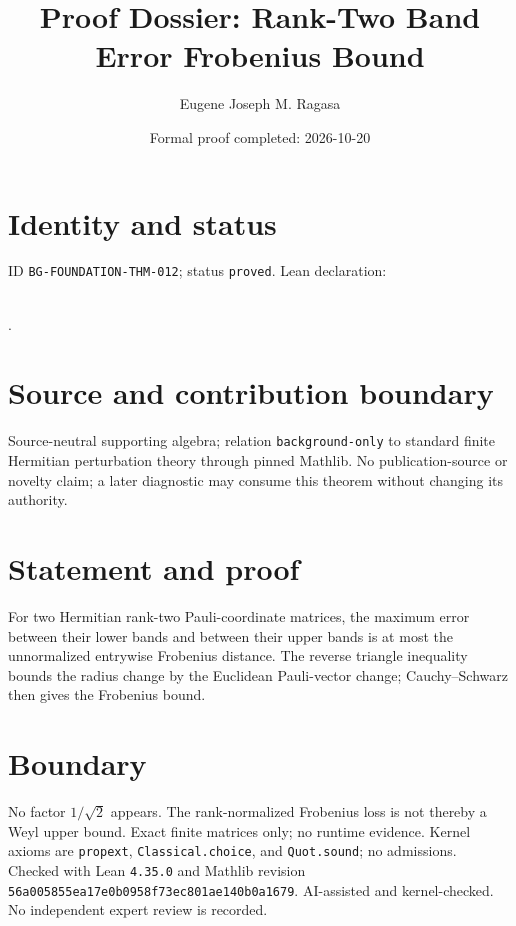 \documentclass[11pt]{article}
\title{Proof Dossier: Rank-Two Band Error Frobenius Bound}\author{Eugene Joseph M. Ragasa}\date{Formal proof completed: 2026-10-20}
\begin{document}
\maketitle
\section{Identity and status}
ID \texttt{BG-FOUNDATION-THM-012}; status \texttt{proved}. Lean declaration:
\par{}\\
{\tiny{}}.
\section{Source and contribution boundary}
Source-neutral supporting algebra; relation \texttt{background-only} to standard finite
Hermitian perturbation theory through pinned Mathlib. No publication-source or novelty
claim; a later diagnostic may consume this theorem without changing its authority.
\section{Statement and proof}
For two Hermitian rank-two Pauli-coordinate matrices, the maximum error between their
lower bands and between their upper bands is at most the unnormalized entrywise
Frobenius distance. The reverse triangle inequality bounds the radius change by the
Euclidean Pauli-vector change; Cauchy--Schwarz then gives the Frobenius bound.
\section{Boundary}
No factor $1/\sqrt2$ appears. The rank-normalized Frobenius loss is not thereby a Weyl
upper bound. Exact finite matrices only; no runtime evidence. Kernel axioms are \texttt{propext}, \texttt{Classical.choice}, and \texttt{Quot.sound}; no admissions. Checked with Lean \texttt{4.35.0} and Mathlib revision \texttt{56a005855ea17e0b0958f73ec801ae140b0a1679}. AI-assisted and kernel-checked. No independent expert review is recorded.
\end{document}

